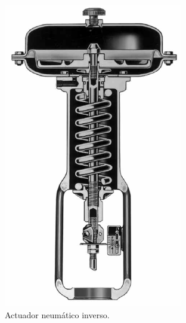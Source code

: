 \begin{figure}[ht]
        \centering
        \begin{subfigure}[b]{0.36\textwidth}
\includegraphics[width=\textwidth]
	{Cap2-DisenoEnsamblado/images/ActuadorValvNeum.pdf}
                \caption{Actuador neumático inverso.}
                \label{fig:actuadorValv}
        \end{subfigure}%
        ~
        \begin{subfigure}[b]{0.36\textwidth}

\end{subfigure}
\end{figure}
